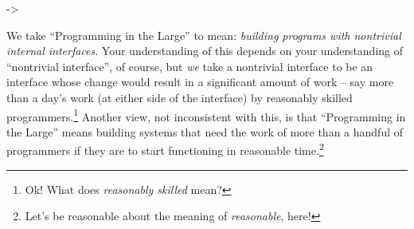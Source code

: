 \documentclass{ip3}
\begin{document}
->



\begin{foil}

\begin{note}
      We take ``Programming in the Large'' to mean: \textit{building
      programs with nontrivial internal interfaces}. Your understanding of
      this depends on your understanding of ``nontrivial interface'', of
      course, but \textit{we} take a nontrivial interface to be an
      interface whose change would result in a significant amount of work
      -- say more than a day's work (at either side of the interface) by
      reasonably skilled programmers.\footnote{Ok! What does
      \textit{reasonably skilled} mean?} Another view, not inconsistent
      with this, is that ``Programming in the Large'' means building
      systems that need the work of more than a handful of programmers if
      they are to start functioning in reasonable time.\footnote{Let's be
      reasonable about the meaning of \textit{reasonable}, here!}

\end{note}


\end{foil}
\end{document}
